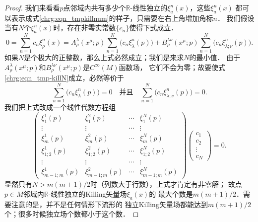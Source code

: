 \begin{proof}
    我们来看看$p$点邻域内共有多少个$\mathbb{R}$-线性独立的$\xi_a^n(x)$，这些$\xi_a^n(x)$
    都可以表示成式\eqref{chrg:eqn_tmpkillnum}的样子，只需要在右上角增加角标$n$．
    我们假设当有$N$个$\xi_a^n(x)$时，存在非零实常数$\{c_n\}$使得下式成立．
    \setlength{\mathindent}{0em}
    \begin{equation}\label{chrg:eqn_tmp-killN}
        0=\sum_{n=1}^{N} c_n \xi_\rho^n(x) =  %
        A_\rho^\lambda(x^\mu;p) \sum_{n=1}^{N} \bigl(c_n\xi_\lambda^n(p)\bigr)+
        B_\rho^{\lambda\nu}(x^\mu;p) \sum_{n=1}^{N}
         \bigl(c_n\xi_{\lambda;\nu}^n(p)\bigr)  .
    \end{equation}  \setlength{\mathindent}{2em}
    如果$N$是个极大的正整数，那么上式必然成立；我们是来求$N$的最小值．
    由于$A_\rho^\lambda(x^\mu;p)$和$B_\rho^{\lambda\nu}(x^\mu;p)$是$C^\infty(M)$函数场，
    它们不会为零；故要使式\eqref{chrg:eqn_tmp-killN}成立，必然等价于
    \begin{equation}\label{chrg:eqn_tmp-killN2}
        \sum_{n=1}^{N} \bigl(c_n\xi_\lambda^n(p)\bigr) =0
        \quad \text{并且}\quad
        \sum_{n=1}^{N} \bigl(c_n\xi_{\lambda;\nu}^n(p)\bigr) =0 .
    \end{equation}
    我们把上式改成一个线性代数方程组
    \begin{equation}\label{chrg:eqn_kvm}
        \begin{pmatrix}
            \xi_1^1(p)& \xi_1^2(p)& \cdots & \xi_1^N(p) \\
            \vdots & \vdots & \cdots & \vdots \\
            \xi_m^1(p)& \xi_m^2(p)& \cdots & \xi_m^N(p) \\
            \xi_{1;2}^1(p)& \xi_{1;2}^2(p)& \cdots & \xi_{1;2}^N(p) \\
            \vdots & \vdots & \cdots & \vdots \\
            \xi_{m-1;m}^1(p)& \xi_{m-1;m}^2(p)& \cdots & \xi_{m-1;m}^N(p)
        \end{pmatrix}
        \begin{pmatrix}
            c_1 \\ c_2 \\ \vdots \\ c_N
        \end{pmatrix} =0 .
    \end{equation}
    显然只有$N>m(m+1)/2$时（列数大于行数），上式才肯定有非零解；
    故点$p\in M$邻域内$\mathbb{R}$-线性独立的Killing矢量场$\xi_a(x)$的
    最大个数是$m(m+1)/2$．需要注意的是，并不是任何情形下流形的
    独立Killing矢量场都能达到$m(m+1)/2$个；很多时候独立场个数都小于这个数．   
\end{proof}

